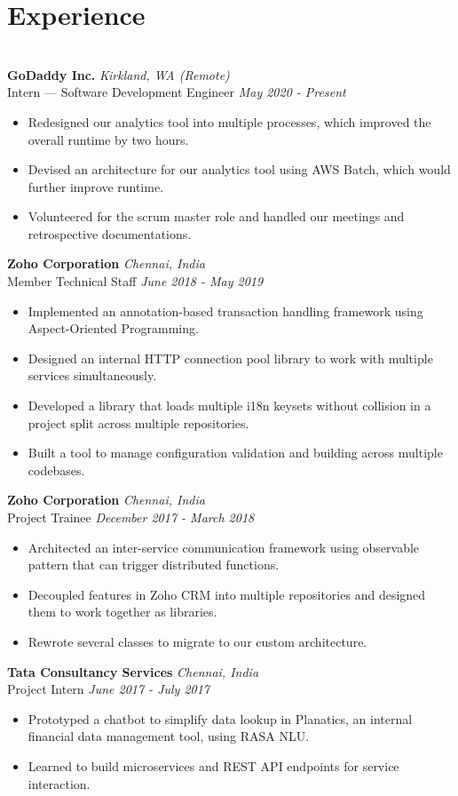 \documentclass{resume}
\begin{document}
\section*{Experience}
\titlerule
\noindent
\\
\textbf{GoDaddy Inc.} \hfill \textit{Kirkland, WA (Remote)} \\
{\small Intern --- Software Development Engineer} \hfill \textit{\small May 2020 - Present}
\begin{itemize}
  \item Redesigned our analytics tool into multiple processes, which improved the overall runtime by two hours.
  \item Devised an architecture for our analytics tool using AWS Batch, which would further improve runtime.
  \item Volunteered for the scrum master role and handled our meetings and retrospective documentations.
\end{itemize}
\textbf{Zoho Corporation} \hfill \textit{Chennai, India} \\
{\small Member Technical Staff} \hfill \textit{\small June 2018 - May 2019}
\begin{itemize}
  \item Implemented an annotation-based transaction handling framework using Aspect-Oriented Programming.
  \item Designed an internal HTTP connection pool library to work with multiple services simultaneously.
  \item Developed a library that loads multiple i18n keysets without collision in a project split across multiple repositories.
  \item Built a tool to manage configuration validation and building across multiple codebases.
\end{itemize}
\textbf{Zoho Corporation} \hfill \textit{Chennai, India} \\
{\small Project Trainee} \hfill \textit{\small December 2017 - March 2018}
\begin{itemize}
  \item Architected an inter-service communication framework using observable pattern that can trigger distributed functions.
  \item Decoupled features in Zoho CRM into multiple repositories and designed them to work together as libraries.
  \item Rewrote several classes to migrate to our custom architecture.
\end{itemize}
\textbf{Tata Consultancy Services} \hfill \textit{Chennai, India} \\
{\small Project Intern} \hfill \textit{\small June 2017 - July 2017}
\begin{itemize}
  \item Prototyped a chatbot to simplify data lookup in Planatics, an internal financial data management tool, using RASA NLU.
  \item Learned to build microservices and REST API endpoints for service interaction.
\end{itemize}
\end{document}
